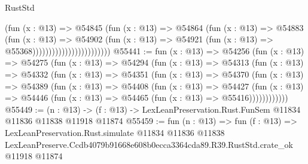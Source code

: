 \begin{lexlean}{RustStd}
\begin{coremodule}
                                        (fun (x : @13) =>
                                        @54845
                                          (fun (x : @13) =>
                                          @54864
                                            (fun (x : @13) =>
                                            @54883
                                              (fun (x : @13) =>
                                              @54902
                                                (fun (x : @13) =>
                                                @54921
                                                  (fun (x : @13) => @55368))))))))))))))))))))))))
@55441 := fun (x : @13) =>
  @54256
    (fun (x : @13) =>
    @54275
      (fun (x : @13) =>
      @54294
        (fun (x : @13) =>
        @54313
          (fun (x : @13) =>
          @54332
            (fun (x : @13) =>
            @54351
              (fun (x : @13) =>
              @54370
                (fun (x : @13) =>
                @54389
                  (fun (x : @13) =>
                  @54408
                    (fun (x : @13) =>
                    @54427
                      (fun (x : @13) =>
                      @54446 (fun (x : @13) => @54465 (fun (x : @13) => @55416))))))))))))
@55449 := (n : @13) ->
  (f : @13) -> LexLeanPreservation.Rust.FunSem @11834 @11836 @11838 @11918 @11874
@55459 := fun (n : @13) =>
  fun (f : @13) =>
  LexLeanPreservation.Rust.simulate
    @11834
    @11836
    @11838
    LexLeanPreserve.Ccdb4079b91668e608b0ecca3364cda89.R39.RustStd.crate_ok
    @11918
    @11874
\end{coremodule}
\end{lexlean}
